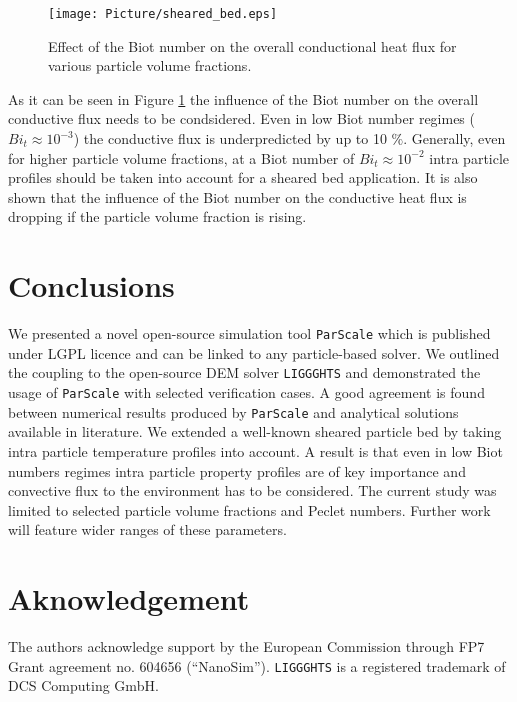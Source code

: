 \documentclass{particles2015}
\begin{document}
\begin{figure}[h!]
   \centering
   \texttt{[image: Picture/sheared\_bed.eps]}
   \caption{Effect of the Biot number on the overall conductional heat flux for various particle volume fractions.}
   \label{fig:sheared_bed}
\end{figure}

As it can be seen in Figure \ref{fig:sheared_bed} the influence of the Biot number on the overall conductive flux needs to be condsidered. Even in low Biot number regimes ($Bi_t \approx 10^{-3}$) the conductive flux is underpredicted by up to 10 $\%$. Generally, even for higher particle volume fractions, at a Biot number of $Bi_t \approx 10^{-2}$ intra particle profiles should be taken into account for a sheared bed application. It is also shown that the influence of the Biot number on the conductive heat flux is dropping if the particle volume fraction is rising. 


\section{Conclusions}
\label{sec:conclusions}

We presented a novel open-source simulation tool \texttt{ParScale} which is published under LGPL licence and can be linked to any particle-based solver. We outlined the coupling to the open-source DEM solver \texttt{LIGGGHTS}\textsuperscript{\textregistered} and demonstrated the usage of \texttt{ParScale} with selected verification cases. A good agreement is found between numerical results produced by \texttt{ParScale} and analytical solutions available in literature. We extended a well-known sheared particle bed by taking intra particle temperature profiles into account. A result is that even in low Biot numbers regimes intra particle property profiles are of key importance and convective flux to the environment has to be considered. The current study was limited to selected particle volume fractions and Peclet numbers. Further work will feature wider ranges of these parameters. 

\section{Aknowledgement}
The authors acknowledge support by the European Commission through FP7 Grant agreement no. 604656 (“NanoSim”). \texttt{LIGGGHTS}\textsuperscript{\textregistered} is a registered trademark of DCS Computing GmbH.

\newpage

\end{document}
